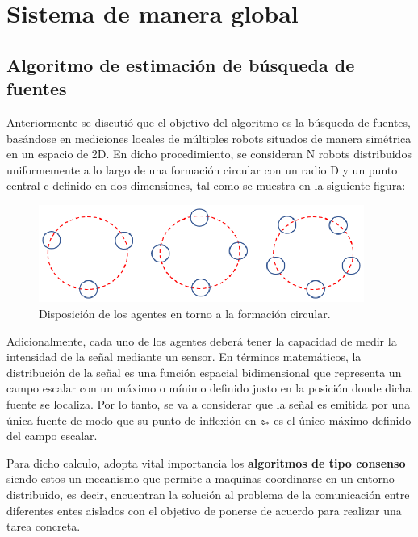 
\newpage
\thispagestyle{empty}
\mbox{}
\chapter{Sistema de manera global}
\label{ch:chapter2}

\section{Algoritmo de estimación de búsqueda de fuentes} \label{Estima}

Anteriormente se discutió que el objetivo del algoritmo es la búsqueda de fuentes, basándose en mediciones locales de múltiples robots situados de manera simétrica en un espacio de 2D. En dicho procedimiento, se consideran N robots distribuidos uniformemente a lo largo de una formación circular con un radio D y un punto central c definido en dos dimensiones, tal como se muestra en la siguiente figura: \\

\begin{figure}[htb]
\centering
\includegraphics[width=0.95\textwidth]{figures/Disposicion_Robots.eps}
\caption{Disposición de los agentes en torno a la formación circular.} \label{Disp:Robots}
\end{figure}
\newpage
Adicionalmente, cada uno de los agentes deberá tener la capacidad de medir la intensidad de la señal mediante un sensor. En términos matemáticos, la distribución de la señal es una función espacial bidimensional que representa un campo escalar con un máximo o mínimo definido justo en la posición donde dicha fuente se localiza. Por lo tanto, se va a considerar que la señal es emitida por una única fuente de modo que su punto de inflexión en $z_*$ es el único máximo definido del campo escalar.

Para dicho calculo, adopta vital importancia los \textbf{algoritmos de tipo consenso} siendo estos un mecanismo que permite a maquinas coordinarse en un entorno distribuido, es decir, encuentran la solución al problema de la comunicación entre diferentes entes aislados con el objetivo de ponerse de acuerdo para realizar una tarea concreta.

